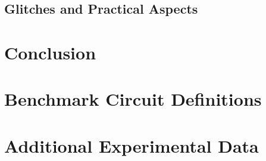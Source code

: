 \documentclass{report}
\begin{document}
\section{Glitches and Practical Aspects}

\chapter{Conclusion}

\appendix
\chapter{Benchmark Circuit Definitions}
\chapter{Additional Experimental Data}
\end{document}

